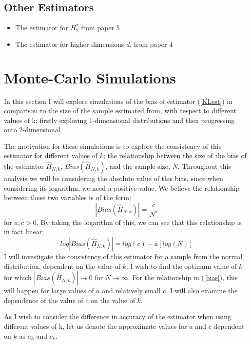 \documentclass{article}
\begin{document}
\subsection{Other Estimators}
\begin{itemize}
\item The estimator for $H_{2}^{*}$ from paper 5

\item The estimator for higher dimensions $d$, from paper 4
\end{itemize}

\section{Monte-Carlo Simulations}

In this section I will explore simulations of the bias of estimator (\ref{KLest}) in comparison to the size of the sample estimated from, with respect to different values of k; firstly exploring 1-dimensional distributions and then progressing onto 2-dimensional.

The motivation for these simulations is to explore the consistency of this estimator for different values of $k$; the relationship between the size of the bias of the estimator $\hat{H}_{N, k}$, $Bias(\hat{H}_{N, k})$,  and the sample size, $N$. Throughout this analysis we will be considering the absolute value of this bias, since when considering its logarithm, we need a positive value. We believe the relationship between these two variables is of the form;
\begin{equation} \label{bias}
|Bias(\hat{H}_{N, k})| = \frac{c}{N^a}
\end{equation}
for $a, c > 0$. By taking the logarithm of this, we can see that this relationship is in fact linear;
\begin{equation} \label{logbias}
log|Bias(\hat{H}_{N, k})| = log(c) - a [log(N)]
\end{equation}
I will investigate the consistency of this estimator for a sample from the normal distribution, dependent on the value of $k$. I wish to find the optimum value of $k$ for which $|Bias(\hat{H}_{N, k})| \to 0$ for $N \to \infty$. For the relationship in (\ref{bias}), this will happen for large values of $a$ and relatively small $c$. I will also examine the dependence of the value of $c$ on the value of $k$.

As I wish to consider the difference in accuracy of the estimator when using different values of k, let us denote the approximate values for $a$ and $c$ dependent on $k$ as $a_{k}$ and $c_{k}$.
\end{document}
